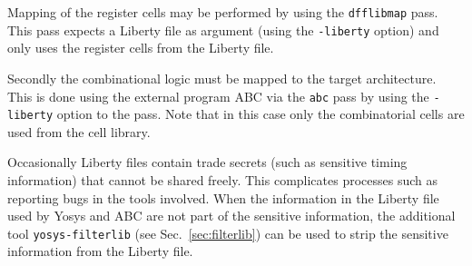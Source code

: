 Mapping of the register cells may be performed by using the {\tt dfflibmap}
pass. This pass expects a Liberty file as argument (using the {\tt -liberty}
option) and only uses the register cells from the Liberty file.

Secondly the combinational logic must be mapped to the target architecture.
This is done using the external program ABC  via the
{\tt abc} pass by using the {\tt -liberty} option to the pass. Note that
in this case only the combinatorial cells are used from the cell library.

Occasionally Liberty files contain trade secrets (such as sensitive timing
information) that cannot be shared freely. This complicates processes such as
reporting bugs in the tools involved. When the information in the Liberty file
used by Yosys and ABC are not part of the sensitive information, the additional
tool {\tt yosys-filterlib} (see Sec.~\ref{sec:filterlib}) can be used to strip
the sensitive information from the Liberty file.

